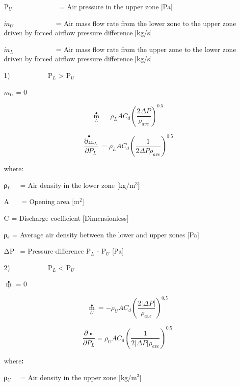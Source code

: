 P\(_{U}\)~~~~~~~~~~~~~ = Air pressure in the upper zone {[}Pa{]}

\({\dot m_U}\) ~~~~~~~~~~~ = Air mass flow rate from the lower zone to the upper zone driven by forced airflow pressure difference {[}kg/s{]}

\({\dot m_L}\) ~~~~~~~~~~~ = Air mass flow rate from the upper zone to the lower zone driven by forced airflow pressure difference {[}kg/s{]}

1)~~~~~~~~~~~P\(_{L}\) \textgreater{} P\(_{U}\)

\({\dot m_U}\) = 0

\begin{equation}
{\mathop m\limits^ \bullet_L} = {\rho_L}A{C_d}{\left( {\frac{{2\Delta P}}{{{\rho_{ave}}}}} \right)^{0.5}}
\end{equation}

\begin{equation}
\frac{{{{\mathop {\partial m}\limits^ \bullet  }_L}}}{{\partial {P_L}}} = {\rho_L}A{C_d}{\left( {\frac{1}{{2\Delta P{\rho_{ave}}}}} \right)^{0.5}}
\end{equation}

where:

ρ\(_{L}\)~~ = Air density in the lower zone {[}kg/m\(^{3}\){]}

A~~~ = Opening area {[}m\(^{2}\){]}

C\(_{ }\) = Discharge coefficient {[}Dimensionless{]}

ρ\(_{e}\) = Average air density between the lower and upper zones {[}Pa{]}

ΔP~ = Pressure difference P\(_{L}\) - P\(_{U}\) {[}Pa{]}

2)~~~~~~~~~~~P\(_{L}\) \textless{} P\(_{U}\)

\({\mathop m\limits^ \bullet_{_L}}\) = 0

\begin{equation}
{\mathop m\limits^ \bullet_U} =  - {\rho_U}A{C_d}{\left( {\frac{{2\left| {\Delta P} \right|}}{{{\rho_{ave}}}}} \right)^{0.5}}
\end{equation}

\begin{equation}
\frac{{\partial \mathop {{m_U}}\limits^ \bullet  }}{{\partial {P_L}}} = {\rho_U}A{C_d}{\left( {\frac{1}{{2\left| {\Delta P} \right|{\rho_{ave}}}}} \right)^{0.5}}
\end{equation}

where\textbf{:}

ρ\(_{U}\)~~ = Air density in the upper zone {[}kg/m\(^{3}\){]}


